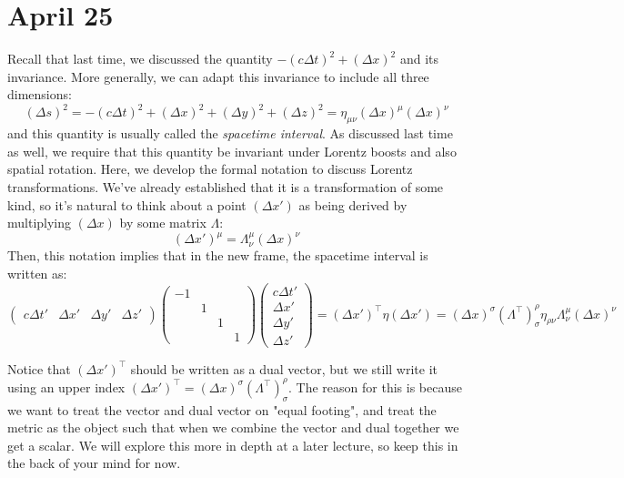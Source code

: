 \section{April 25}
Recall that last time, we discussed the quantity \( -(c \Delta t)^2 + (\Delta x)^2 \) and its invariance.
More generally, we can adapt this invariance to include all three dimensions:
\[
	(\Delta s)^2 = -(c \Delta t)^2 + (\Delta x)^2 + (\Delta y)^2 + (\Delta z)^2 = \eta_{\mu \nu}(\Delta
	x)^{\mu}(\Delta x)^{\nu}
\]
and this quantity is usually called the \textit{spacetime interval}. As discussed last time as well, we
require that this quantity be invariant under Lorentz boosts and also spatial rotation. Here, we develop the
formal notation to discuss Lorentz transformations. We've already established that it is a transformation of
some kind, so it's natural to think about a point \( (\Delta x') \) as being derived by multiplying \( (\Delta
x) \) by some matrix \( \Lambda \):
\[
	(\Delta x')^{\mu} = \Lambda^{\mu}_{\nu}(\Delta x)^{\nu}
\]
Then, this notation implies that in the new frame, the spacetime interval is written as:
\[
	\begin{pmatrix} c \Delta t' & \Delta x' & \Delta y' & \Delta z' \end{pmatrix}
	\begin{pmatrix} -1 & & & \\ & 1 & & \\ & & 1 & \\ & & & 1 \end{pmatrix}
	\begin{pmatrix} c \Delta t'\\ \Delta x' \\ \Delta y' \\ \Delta z' \end{pmatrix} = (\Delta x')^{\top}
	\eta (\Delta x') = 
	(\Delta x)^{\sigma}(\Lambda^{\top})^{\rho}_{\sigma} \eta_{\rho \nu} \Lambda^{\mu}_\nu (\Delta x)^{\nu}
\]
\begin{aside}
	Notice that \( (\Delta x')^{\top} \) should be written as a dual vector, but we still write it using an
	upper index \( (\Delta x')^{\top} = (\Delta x)^{\sigma} (\Lambda^{\top})^{\rho}_\sigma \). The reason for
	this is because we want to treat the vector and dual vector on "equal footing", and treat the metric as
	the object such that when we combine the vector and dual together we get a scalar. We will explore this
	more in depth at a later lecture, so keep this in the back of your mind for now.    
\end{aside}

